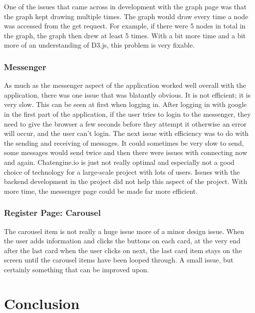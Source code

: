 One of the issues that came across in development with the graph page was that the graph kept drawing multiple times. The graph would draw every time a node was accessed from the get request. For example, if there were 5 nodes in total in the graph, the graph then drew at least 5 times. With a bit more time and a bit more of an understanding of D3.js, this problem is very fixable. \\

\subsection{Messenger}

As much as the messenger aspect of the application worked well overall with the application, there was one issue that was blatantly obvious. It is not efficient; it is very slow. This can be seen at first when logging in. After logging in with google in the first part of the application, if the user tries to login to the messenger, they need to give the browser a few seconds before they attempt it otherwise an error will occur, and the user can’t login. The next issue with efficiency was to do with the sending and receiving of messages. It could sometimes be very slow to send, some messages would send twice and then there were issues with connecting now and again. Chatengine.io is just not really optimal and especially not a good choice of technology for a large-scale project with lots of users. Issues with the backend development in the project did not help this aspect of the project. With more time, the messenger page could be made far more efficient. \\


\subsection{Register Page: Carousel}

The carousel item is not really a huge issue more of a minor design issue. When the user adds information and clicks the buttons on each card, at the very end after the last card when the user clicks on next, the last card item stays on the screen until the carousel items have been looped through. A small issue, but certainly something that can be improved upon. \\

\chapter{Conclusion}

